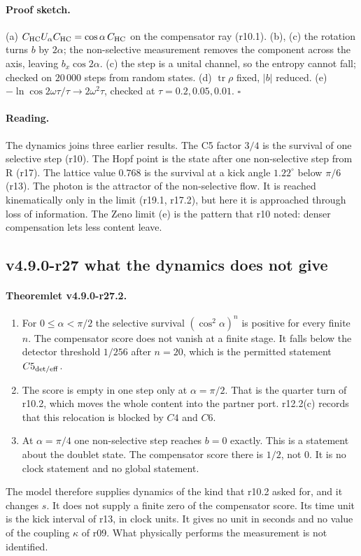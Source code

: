 \paragraph{Proof sketch.}
(a) \(C_{\mathrm{HC}}U_\alpha C_{\mathrm{HC}}=\cos\alpha\,C_{\mathrm{HC}}\) on the compensator ray (r10.1).  (b), (c) the rotation turns \(b\) by \(2\alpha\); the
non-selective measurement removes the component across the axis, leaving \(b_x\cos2\alpha\).  (c) the step is a unital channel, so the
entropy cannot fall; checked on \(20\,000\) steps from random states.  (d) \(\operatorname{tr}\rho\) fixed, \(|b|\) reduced.
(e) \(-\ln\cos2\omega\tau/\tau\to2\omega^2\tau\), checked at \(\tau=0.2,0.05,0.01\).  \(\square\)

\paragraph{Reading.}
The dynamics joins three earlier results.  The C5 factor \(3/4\) is the survival of one selective step (r10).  The Hopf point is the
state after one non-selective step from R (r17).  The lattice value \(0.768\) is the survival at a kick angle \(1.22^\circ\) below
\(\pi/6\) (r13).  The photon is the attractor of the non-selective flow.  It is reached kinematically only in the limit (r19.1, r17.2),
but here it is approached through loss of information.  The Zeno limit (e) is the pattern that r10 noted: denser compensation
lets less content leave.

\subsection*{v4.9.0-r27 what the dynamics does not give}
\label{subsec:v490-r27-limits}

\paragraph{Theoremlet v4.9.0-r27.2.}
\begin{enumerate}[leftmargin=2em]
\item[(a)] For \(0\le\alpha<\pi/2\) the selective survival \((\cos^2\alpha)^n\) is positive for every finite \(n\).  The compensator score
does not vanish at a finite stage.  It falls below the detector threshold \(1/256\) after \(n=20\), which is the permitted statement
\(C5_{\rm det/eff}\).
\item[(b)] The score is empty in one step only at \(\alpha=\pi/2\).  That is the quarter turn of r10.2, which moves the whole content
into the partner port.  r12.2(c) records that this relocation is blocked by \(C4\) and \(C6\).
\item[(c)] At \(\alpha=\pi/4\) one non-selective step reaches \(b=0\) exactly.  This is a statement about the doublet state.  The
compensator score there is \(1/2\), not \(0\).  It is no clock statement and no global statement.
\end{enumerate}
The model therefore supplies dynamics of the kind that r10.2 asked for, and it changes \(s\).  It does not supply a finite zero of
the compensator score.  Its time unit is the kick interval of r13, in clock units.  It gives no unit in seconds and no value of the
coupling \(\kappa\) of r09.  What physically performs the measurement is not identified.

